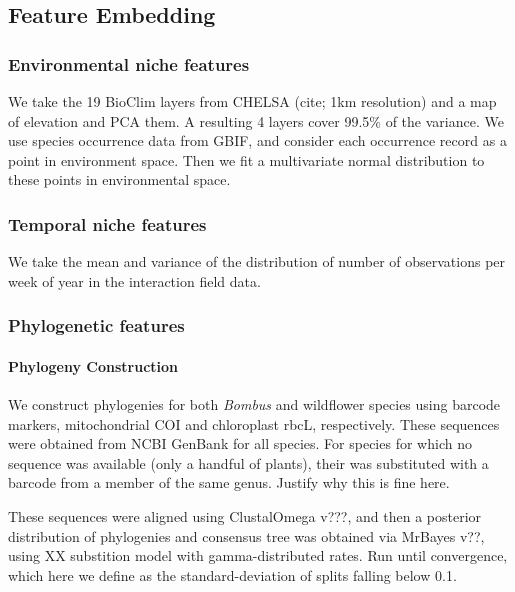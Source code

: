 \documentclass[11pt]{article}
\begin{document}
\hypertarget{feature-embedding}{%
\subsection{Feature Embedding}\label{feature-embedding}}

\hypertarget{environmental-niche-features}{%
\subsubsection{Environmental niche
features}\label{environmental-niche-features}}

We take the 19 BioClim layers from CHELSA (cite; 1km resolution) and a
map of elevation and PCA them. A resulting 4 layers cover 99.5\% of the
variance. We use species occurrence data from GBIF, and consider each
occurrence record as a point in environment space. Then we fit a
multivariate normal distribution to these points in environmental space.

\hypertarget{temporal-niche-features}{%
\subsubsection{Temporal niche features}\label{temporal-niche-features}}

We take the mean and variance of the distribution of number of
observations per week of year in the interaction field data.

\hypertarget{phylogenetic-features}{%
\subsubsection{Phylogenetic features}\label{phylogenetic-features}}

\hypertarget{phylogeny-construction}{%
\paragraph{Phylogeny Construction}\label{phylogeny-construction}}

We construct phylogenies for both \emph{Bombus} and wildflower species
using barcode markers, mitochondrial COI and chloroplast rbcL,
respectively. These sequences were obtained from NCBI GenBank for all
species. For species for which no sequence was available (only a handful
of plants), their was substituted with a barcode from a member of the
same genus. Justify why this is fine here.

These sequences were aligned using ClustalOmega v???, and then a
posterior distribution of phylogenies and consensus tree was obtained
via MrBayes v??, using XX substition model with gamma-distributed rates.
Run until convergence, which here we define as the standard-deviation of
splits falling below 0.1.
\end{document}
